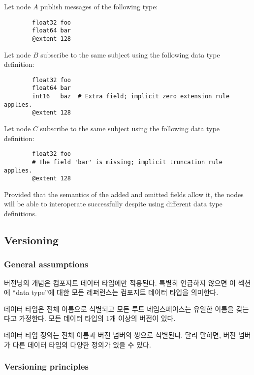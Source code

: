 \begin{remark}
    Let node $A$ publish messages of the following type:

    \begin{verbatim}
        float32 foo
        float64 bar
        @extent 128
    \end{verbatim}

    Let node $B$ subscribe to the same subject using the following data type definition:

    \begin{verbatim}
        float32 foo
        float64 bar
        int16   baz  # Extra field; implicit zero extension rule applies.
        @extent 128
    \end{verbatim}

    Let node $C$ subscribe to the same subject using the following data type definition:

    \begin{verbatim}
        float32 foo
        # The field 'bar' is missing; implicit truncation rule applies.
        @extent 128
    \end{verbatim}

    Provided that the semantics of the added and omitted fields allow it,
    the nodes will be able to interoperate successfully despite using different data type definitions.
\end{remark}

\subsection{Versioning}

\subsubsection{General assumptions}

버전닝의 개념은 컴포지트 데이터 타입에만 적용된다.
특별히 언급하지 않으면 이 섹션에 ``data type''에 대한 모든 레퍼런스는 컴포지트 데이터 타입을 의미한다.

데이터 타입은 전체 이름으로 식별되고 모든 루트 네임스페이스는 유일한 이름을 갖는다고 가정한다.
모든 데이터 타입의 1개 이상의 버전이 있다.

데이터 타입 정의는 전체 이름과 버전 넘버의 쌍으로 식별된다.
달리 말하면, 버전 넘버가 다른 데이터 타입의 다양한 정의가 있을 수 있다.

\subsubsection{Versioning principles}

